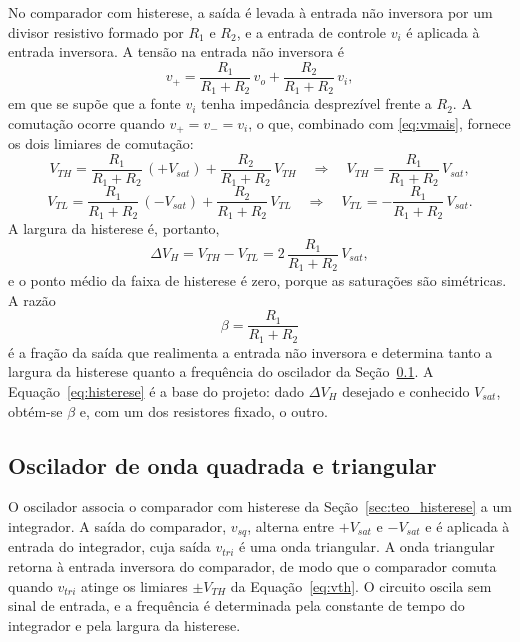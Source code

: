 \documentclass[11pt,a4paper]{article}
\begin{document}
No comparador com histerese, a saída é levada à entrada não inversora por um
divisor resistivo formado por $R_1$ e $R_2$, e a entrada de controle $v_i$ é
aplicada à entrada inversora. A tensão na entrada não inversora é
\begin{equation}
v_+ = \frac{R_1}{R_1 + R_2}\,v_o + \frac{R_2}{R_1 + R_2}\,v_i,
\label{eq:vmais}
\end{equation}
em que se supõe que a fonte $v_i$ tenha impedância desprezível frente a $R_2$.
A comutação ocorre quando $v_+ = v_- = v_i$, o que, combinado com
\eqref{eq:vmais}, fornece os dois limiares de comutação:
\begin{equation}
V_{TH} = \frac{R_1}{R_1 + R_2}\,(+V_{sat}) + \frac{R_2}{R_1 + R_2}\,V_{TH}
\quad\Longrightarrow\quad
V_{TH} = \frac{R_1}{R_1 + R_2}\,V_{sat},
\label{eq:vth}
\end{equation}
\begin{equation}
V_{TL} = \frac{R_1}{R_1 + R_2}\,(-V_{sat}) + \frac{R_2}{R_1 + R_2}\,V_{TL}
\quad\Longrightarrow\quad
V_{TL} = -\frac{R_1}{R_1 + R_2}\,V_{sat}.
\label{eq:vtl}
\end{equation}
A largura da histerese é, portanto,
\begin{equation}
\Delta V_H = V_{TH} - V_{TL} = 2\,\frac{R_1}{R_1 + R_2}\,V_{sat},
\label{eq:histerese}
\end{equation}
e o ponto médio da faixa de histerese é zero, porque as saturações são
simétricas. A razão
\begin{equation}
\beta = \frac{R_1}{R_1 + R_2}
\label{eq:beta}
\end{equation}
é a fração da saída que realimenta a entrada não inversora e determina tanto a
largura da histerese quanto a frequência do oscilador da
Seção~\ref{sec:teo_oscilador}. A Equação~\eqref{eq:histerese} é a base do
projeto: dado $\Delta V_H$ desejado e conhecido $V_{sat}$, obtém-se $\beta$ e,
com um dos resistores fixado, o outro.
 
\subsection{Oscilador de onda quadrada e triangular}
\label{sec:teo_oscilador}
 
O oscilador associa o comparador com histerese da Seção~\ref{sec:teo_histerese}
a um integrador. A saída do comparador, $v_{sq}$, alterna entre $+V_{sat}$ e
$-V_{sat}$ e é aplicada à entrada do integrador, cuja saída $v_{tri}$ é uma onda
triangular. A onda triangular retorna à entrada inversora do comparador, de modo
que o comparador comuta quando $v_{tri}$ atinge os limiares $\pm V_{TH}$ da
Equação~\eqref{eq:vth}. O circuito oscila sem sinal de entrada, e a frequência é
determinada pela constante de tempo do integrador e pela largura da histerese.
 
\end{document}
